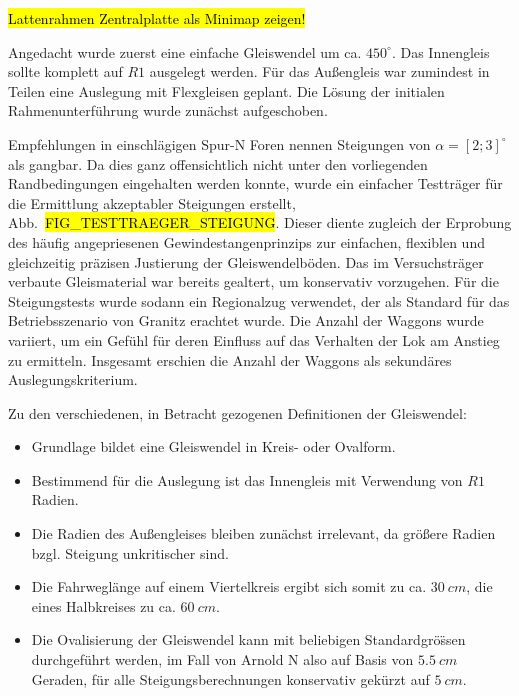 \hl{Lattenrahmen Zentralplatte als Minimap zeigen!}

Angedacht wurde zuerst eine einfache Gleiswendel um ca. $450^\circ$.
Das Innengleis sollte komplett auf $R1$ ausgelegt werden.
F\"ur das Au{\ss}engleis war zumindest in Teilen eine Auslegung mit Flexgleisen geplant.
Die L\"osung der initialen Rahmenunterf\"uhrung wurde zun\"achst aufgeschoben.

Empfehlungen in einschl\"agigen Spur-N Foren nennen Steigungen von $\alpha = \left[ 2 ; 3 \right]^\circ$ als gangbar.
Da dies ganz offensichtlich nicht unter den vorliegenden Randbedingungen eingehalten werden konnte, wurde ein einfacher Testtr\"ager f\"ur die Ermittlung akzeptabler Steigungen erstellt, Abb.~\hl{FIG\_TESTTRAEGER\_STEIGUNG}.
Dieser diente zugleich der Erprobung des h\"aufig angepriesenen Gewindestangenprinzips zur einfachen, flexiblen und gleichzeitig pr\"azisen Justierung der Gleiswendelb\"oden.
Das im Versuchstr\"ager verbaute Gleismaterial war bereits gealtert, um konservativ vorzugehen.
F\"ur die Steigungstests wurde sodann ein Regionalzug verwendet, der als Standard f\"ur das Betriebsszenario von Granitz erachtet wurde.
Die Anzahl der Waggons wurde variiert, um ein Gef\"uhl f\"ur deren Einfluss auf das Verhalten der Lok am Anstieg zu ermitteln.
Insgesamt erschien die Anzahl der Waggons als sekund\"ares Auslegungskriterium.




Zu den verschiedenen, in Betracht gezogenen Definitionen der Gleiswendel:
\begin{itemize}
	\item Grundlage bildet eine Gleiswendel in Kreis- oder Ovalform.
	\item Bestimmend f\"ur die Auslegung ist das Innengleis mit Verwendung von $R1$ Radien.
	\item Die Radien des Au{\ss}engleises bleiben zun\"achst irrelevant, da gr\"o{\ss}ere Radien bzgl. Steigung unkritischer sind.
	\item Die Fahrwegl\"ange auf einem Viertelkreis ergibt sich somit zu ca. $30~cm$, die eines Halbkreises zu ca. $60~cm$.
	\item Die Ovalisierung der Gleiswendel kann mit beliebigen Standardgr\"o\"{ss}en durchgef\"uhrt werden, im Fall von Arnold N also auf Basis von $5.5~cm$ Geraden, f\"ur alle Steigungsberechnungen konservativ gek\"urzt auf $5~cm$.
\end{itemize}

